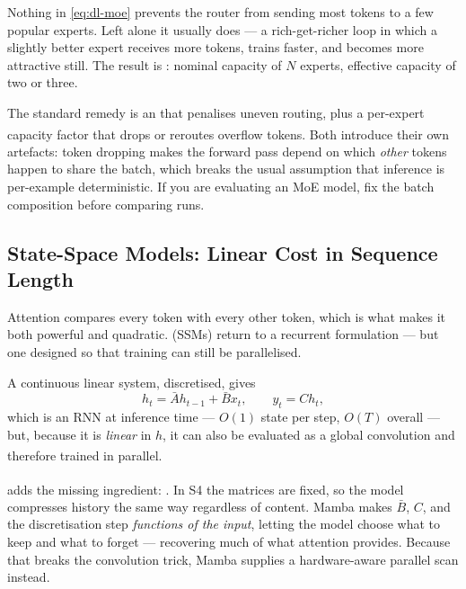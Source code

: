\begin{cautionbox}
Nothing in \cref{eq:dl-moe} prevents the router from sending most tokens to a
few popular experts. Left alone it usually does --- a rich-get-richer loop in
which a slightly better expert receives more tokens, trains faster, and becomes
more attractive still. The result is : nominal
capacity of $N$ experts, effective capacity of two or three.

The standard remedy is an  that
penalises uneven routing, plus a per-expert capacity factor that drops or
reroutes overflow tokens\textsuperscript{\cite{fedusSwitchTransformersScaling2022}}.
Both introduce their own artefacts: token dropping makes the forward pass
depend on which \emph{other} tokens happen to share the batch, which breaks the
usual assumption that inference is per-example deterministic. If you are
evaluating an MoE model, fix the batch composition before comparing runs.
\end{cautionbox}

\subsection{State-Space Models: Linear Cost in Sequence Length}

Attention compares every token with every other token, which is what makes it
both powerful and quadratic.  (SSMs) return to a
recurrent formulation --- but one designed so that training can still be
parallelised.

A continuous linear system, discretised, gives
\begin{equation}
  h_t = \bar{A}h_{t-1} + \bar{B}x_t,
  \qquad
  y_t = C h_t ,
  \label{eq:dl-ssm}
\end{equation}
which is an RNN at inference time --- $O(1)$ state per step, $O(T)$ overall ---
but, because it is \emph{linear} in $h$, it can also be evaluated as a global
convolution and therefore trained in
parallel\textsuperscript{\cite{guEfficientlyModelingLong2022}}.

 adds the missing ingredient:
\textsuperscript{\cite{guMambaLinearTimeSequence2024}}.
In S4 the matrices are fixed, so the model compresses history the same way
regardless of content. Mamba makes $\bar B$, $C$, and the discretisation step
\emph{functions of the input}, letting the model choose what to keep and what
to forget --- recovering much of what attention provides. Because that breaks
the convolution trick, Mamba supplies a hardware-aware parallel scan instead.

